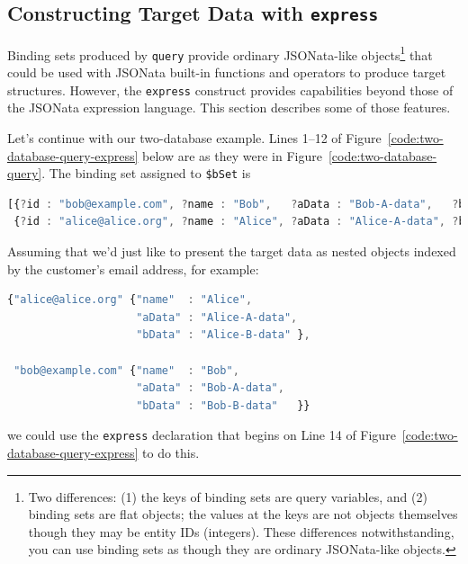 \documentclass[10pt,letterpaper]{article} %
\newcommand{\stt}[1]{\texttt{#1}} %
\begin{document}
\subsection{Constructing  Target Data with \stt{express}}

Binding sets produced by \stt{query} provide ordinary JSONata-like objects\footnote{Two differences: (1) the keys of binding sets are query variables, and (2) binding sets are flat objects; the values at the keys are not objects themselves though they may be entity IDs (integers). These differences notwithstanding, you can use binding sets as though they are ordinary JSONata-like objects.} that could be used with JSONata built-in functions and operators to produce target structures.
However, the \stt{express} construct provides capabilities beyond those of the JSONata expression language.
This section describes some of those features.

Let's continue with our two-database example.
Lines 1--12 of Figure~\ref{code:two-database-query-express} below are as they were in Figure~\ref{code:two-database-query}.
The binding set assigned to \stt{\$bSet} is
\begin{lstlisting}[language=JavaScript,numbers=none,basicstyle=\ttfamily\scriptsize]
[{?id : "bob@example.com", ?name : "Bob",   ?aData : "Bob-A-data",   ?bData : "Bob-B-data"  },
 {?id : "alice@alice.org", ?name : "Alice", ?aData : "Alice-A-data", ?bData : "Alice-B-data"}].
\end{lstlisting} \vspace{-2em}

Assuming that we'd just like to present the target data as nested objects indexed by the customer's email address, for example:

\begin{lstlisting}[language=JavaScript,numbers=none,basicstyle=\ttfamily\scriptsize]
{"alice@alice.org" {"name"  : "Alice",
                    "aData" : "Alice-A-data",
                    "bData" : "Alice-B-data" },

 "bob@example.com" {"name"  : "Bob",
                    "aData" : "Bob-A-data",
                    "bData" : "Bob-B-data"   }}
\end{lstlisting} \vspace{-2em}

\hspace{-2em} we could use the \stt{express} declaration that begins on Line 14 of Figure~\ref{code:two-database-query-express} to do this.
\end{document}
